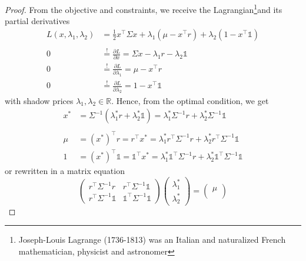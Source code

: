 \documentclass[a4paper, english, 11pt, onecolumn, oneside, final]{article}
\numberwithin{equation}{section}   %
\newcommand{\R}{\mathbb{R}}                 %
\newcommand{\one}{\mathds 1}
\newcommand{\precision}{\Sigma^{-1}}
\newcommand{\A}{r^\top\Sigma^{-1} r}
\newcommand{\B}{r^\top\Sigma^{-1}\one}
\newcommand{\C}{\one^\top\Sigma^{-1}\one}
\theoremstyle{plain}
\theoremstyle{definition}
\theoremstyle{remark}
\begin{document}
\begin{proof}
    From the objective and constraints, we receive the Lagrangian\footnote{Joseph-Louis Lagrange (1736-1813) was an Italian and naturalized French mathematician, physicist and astronomer}and its partial derivatives
    \begin{equation*}
        \begin{aligned}
            L(x,\lambda_1,\lambda_2)
        &= \frac{1}{2}x^\top\Sigma x
        + \lambda_1\left(\mu-x^\top r\right)
        + \lambda_2\left(1-x^\top\one\right) \\\\
        0 &\overset{!}{=} \frac{\partial L}{\partial x}
        = \Sigma x - \lambda_1r - \lambda_2\one\\
        0 &\overset{!}{=} \frac{\partial L}{\partial\lambda_1}
        = \mu-x^\top r\\
        0 &\overset{!}{=} \frac{\partial L}{\partial\lambda_2}
        = 1-x^\top\one
        \end{aligned}
    \end{equation*}
    with shadow prices $\lambda_1,\lambda_2\in\R$. Hence, from the optimal condition, we get
    \begin{equation*}
        \begin{aligned}
            x^* &= \precision(\lambda_1^*r + \lambda_2^*\one)
            = \lambda_1^*\precision r + \lambda_2^*\precision\one \\\\
            \mu &= (x^*)^\top r = r^\top x^* = \lambda_1^*r^\top\precision r + \lambda_2^*r^\top\precision\one \\
            1 &= (x^*)^\top\one = \one^\top x^* = \lambda_1^*\one^\top\precision r + \lambda_2^*\one^\top\precision\one
        \end{aligned}
    \end{equation*}
    or rewritten in a matrix equation
    \begin{equation*}
        \begin{pmatrix}
            \A & \B \\
            \B & \C
        \end{pmatrix}
        \begin{pmatrix}
            \lambda_1^* \\
            \lambda_2^*
        \end{pmatrix} =
        \begin{pmatrix}
            \mu \\

\end{pmatrix}
\end{equation*}
\end{proof}
\end{document}
